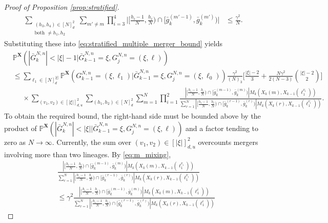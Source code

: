 \documentclass[10pt,a4paper]{amsart}
\newcommand{\bbP}{\mathbb{P}}
\newcommand{\bfX}{\mathbf{X}}
\begin{document}
\begin{proof}[Proof of Proposition \ref{prop:stratified}]
\begin{align*}
\sum_{ \substack{ ( h_3, h_4 ) \in [ N ]_d^2 \\ \text{both } \neq h_1, h_2 } } \sum_{ m' \neq m } \prod_{ i = 3 }^4 \Big| \Big[ \frac{ h_i - 1 }{ N }, \frac{ h_i }{ N } \Big) \cap [ \bar{ g }_k^{ ( m' - 1 ) }, \bar{ g }_k^{ ( m' ) } ) \Big| &\leq \frac{ \gamma^2 }{ N }.
\end{align*}
Substituting these into \eqref{eq:stratified_multiple_merger_bound} yields
\begin{align*}
&\bbP^{ \bfX }( | \bar{ G }_k^{ N, n } | < | \xi | - 1 | \bar{ G }_{ k - 1 }^{ N, n } = \xi, G_j^{ N, n } = ( \xi, \ell ) ) \\
&\leq \sum_{ \ell_1 \in [ N ]_d^{ | \xi | } } \bbP^{ \bfX }( G_{ k - 1 }^{ N, n } = ( \xi, \ell_1 ) | \bar{ G }_{ k - 1 }^{ N, n } = \xi, G_j^{ N, n } = ( \xi, \ell_0 ) ) \frac{ \gamma^2 }{ ( N )_3 } \Bigg[ \frac{ | \xi | - 2 }{ 3 } + \frac{ N \gamma^2 }{ 2 ( N - 3 ) } \binom{ | \xi | - 2 }{ 2 } \Bigg]\\
&\phantom{\leq} \times  \sum_{ ( v_1, v_2 ) \in [ | \xi | ]_{ d, u }^2 } \sum_{ ( h_1, h_2 ) \in [ N ]_d^2 } \sum_{ m = 1 }^N  \prod_{ i = 1 }^2 \frac{ | [ \frac{ h_i - 1 }{ N }, \frac{ h_i }{ N } ) \cap [ \bar{ g }_k^{ ( m - 1 ) }, \bar{ g }_k^{ ( m ) } ) | M_k( X_k( m ), X_{ k - 1 }( \ell_1^{ v_i } ) ) }{ \sum_{ r = 1 }^N | [ \frac{ h_i - 1 }{ N }, \frac{ h_i }{ N } ) \cap [ \bar{ g }_k^{ ( r - 1 ) }, \bar{ g }_k^{ ( r ) } ) | M_k( X_k( r ), X_{ k - 1 }( \ell_1^{ v_i } ) ) }.
\end{align*}
To obtain the required bound, the right-hand side must be bounded above by the product of $\bbP^{ \bfX }( | \bar{ G }_k^{ N, n } | < | \xi | | \bar{ G }_{ k - 1 }^{ N, n } = \xi, G_j^{ N, n } = ( \xi, \ell ) )$ and a factor tending to zero as $N \to \infty$.
Currently, the sum over $( v_1, v_2 ) \in [ | \xi | ]_{ d, u }^2$ overcounts mergers involving more than two lineages.
By \eqref{eq:m_mixing}, 
\begin{align*}
&\frac{ | [ \frac{ h_i - 1 }{ N }, \frac{ h_i }{ N } ) \cap [ \bar{ g }_k^{ ( m - 1 ) }, \bar{ g }_k^{ ( m ) } ) | M_k( X_k( m ), X_{ k - 1 }( \ell_1^{ v_i } ) ) }{ \sum_{ r = 1 }^N | [ \frac{ h_i - 1 }{ N }, \frac{ h_i }{ N } ) \cap [ \bar{ g }_k^{ ( r - 1 ) }, \bar{ g }_k^{ ( r ) } ) | M_k( X_k( r ), X_{ k - 1 }( \ell_1^{ v_i } ) ) } \\
&\leq \gamma^2 \frac{ | [ \frac{ h_i - 1 }{ N }, \frac{ h_i }{ N } ) \cap [ \bar{ g }_k^{ ( m - 1 ) }, \bar{ g }_k^{ ( m ) } ) | M_k( X_k( m ), X_{ k - 1 }( \ell_1^i ) ) }{ \sum_{ r = 1 }^N | [ \frac{ h_i - 1 }{ N }, \frac{ h_i }{ N } ) \cap [ \bar{ g }_k^{ ( r - 1 ) }, \bar{ g }_k^{ ( r ) } ) | M_k( X_k( r ), X_{ k - 1 }( \ell_1^i ) ) }

\end{align*}
\end{proof}
\end{document}
